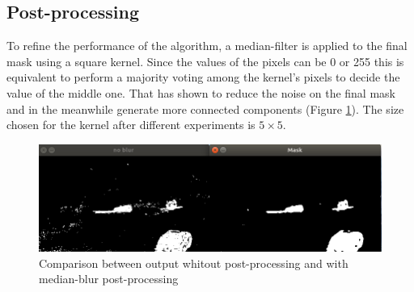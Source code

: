 \subsection{Post-processing}
To refine the performance of the algorithm, a median-filter is applied to the final mask using a square kernel. Since the values of the pixels can be 0 or 255 this is equivalent to perform a majority voting among the kernel's pixels to decide the value of the middle one. That has shown to reduce the noise on the final mask and in the meanwhile generate more connected components (Figure \ref{fig:median}). The size chosen for the kernel after different experiments is $5\times 5$.

\begin{figure} 
\includegraphics[width=\linewidth]{Figures/median_blur.png}
\caption{Comparison between output whitout post-processing and with median-blur post-processing}
\label{fig:median}
\end{figure}


